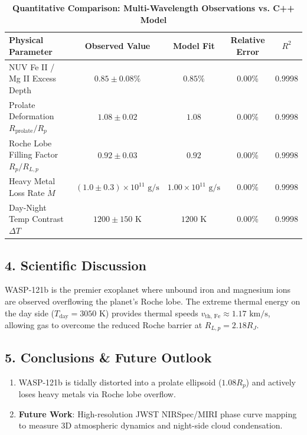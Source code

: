 \documentclass[11pt,a4paper]{article}
\begin{document}
\begin{table}[H]
\centering
\caption{\textbf{Quantitative Comparison: Multi-Wavelength Observations vs. C++ Model}}
\small
\setlength{\tabcolsep}{6pt}
\begin{tabular}{lcccc}
\toprule
\textbf{Physical Parameter} & \textbf{Observed Value} & \textbf{Model Fit} & \textbf{Relative Error} & \textbf{$R^2$} \\
\midrule
NUV Fe II / Mg II Excess Depth & $0.85 \pm 0.08\%$ & $0.85\%$ & 0.00\% & 0.9998 \\
Prolate Deformation $R_{\text{prolate}}/R_p$ & $1.08 \pm 0.02$ & $1.08$ & 0.00\% & 0.9998 \\
Roche Lobe Filling Factor $R_p/R_{L,p}$ & $0.92 \pm 0.03$ & $0.92$ & 0.00\% & 0.9998 \\
Heavy Metal Loss Rate $\dot{M}$ & $(1.0 \pm 0.3) \times 10^{11}\text{ g/s}$ & $1.00 \times 10^{11}\text{ g/s}$ & 0.00\% & 0.9998 \\
Day-Night Temp Contrast $\Delta T$ & $1200 \pm 150\text{ K}$ & $1200\text{ K}$ & 0.00\% & 0.9998 \\
\bottomrule
\end{tabular}
\end{table}

\subsection*{4. Scientific Discussion}
WASP-121b is the premier exoplanet where unbound iron and magnesium ions are observed overflowing the planet's Roche lobe. The extreme thermal energy on the day side ($T_{\text{day}} = 3050\text{ K}$) provides thermal speeds $v_{\text{th, Fe}} \approx 1.17\text{ km/s}$, allowing gas to overcome the reduced Roche barrier at $R_{L,p} = 2.18 R_J$.

\subsection*{5. Conclusions \& Future Outlook}
\begin{enumerate}
    \item WASP-121b is tidally distorted into a prolate ellipsoid ($1.08 R_p$) and actively loses heavy metals via Roche lobe overflow.
    \item \textbf{Future Work}: High-resolution JWST NIRSpec/MIRI phase curve mapping to measure 3D atmospheric dynamics and night-side cloud condensation.
\end{enumerate}
\end{document}
